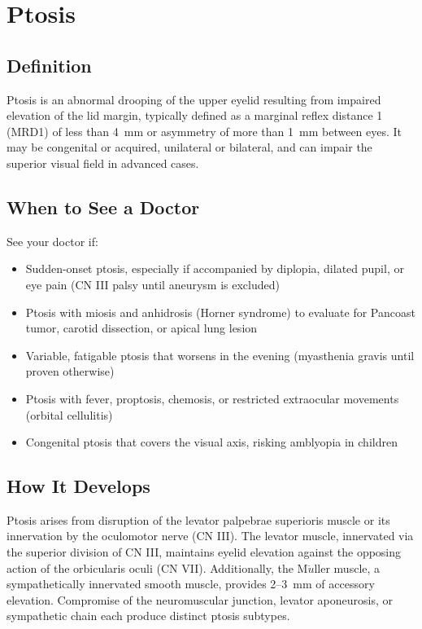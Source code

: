 \chapter{Ptosis}

\section*{Definition}
Ptosis is an abnormal drooping of the upper eyelid resulting from impaired elevation of the lid margin, typically defined as a marginal reflex distance 1 (MRD1) of less than 4~mm or asymmetry of more than 1~mm between eyes. It may be congenital or acquired, unilateral or bilateral, and can impair the superior visual field in advanced cases.

\section*{When to See a Doctor}
See your doctor if:
\begin{itemize}
  \item Sudden-onset ptosis, especially if accompanied by diplopia, dilated pupil, or eye pain (CN III palsy until aneurysm is excluded)
  \item Ptosis with miosis and anhidrosis (Horner syndrome) to evaluate for Pancoast tumor, carotid dissection, or apical lung lesion
  \item Variable, fatigable ptosis that worsens in the evening (myasthenia gravis until proven otherwise)
  \item Ptosis with fever, proptosis, chemosis, or restricted extraocular movements (orbital cellulitis)
  \item Congenital ptosis that covers the visual axis, risking amblyopia in children
\end{itemize}

\section*{How It Develops}
Ptosis arises from disruption of the levator palpebrae superioris muscle or its innervation by the oculomotor nerve (CN III). The levator muscle, innervated via the superior division of CN III, maintains eyelid elevation against the opposing action of the orbicularis oculi (CN VII). Additionally, the M$\ddot{u}$ller muscle, a sympathetically innervated smooth muscle, provides 2--3~mm of accessory elevation. Compromise of the neuromuscular junction, levator aponeurosis, or sympathetic chain each produce distinct ptosis subtypes.

